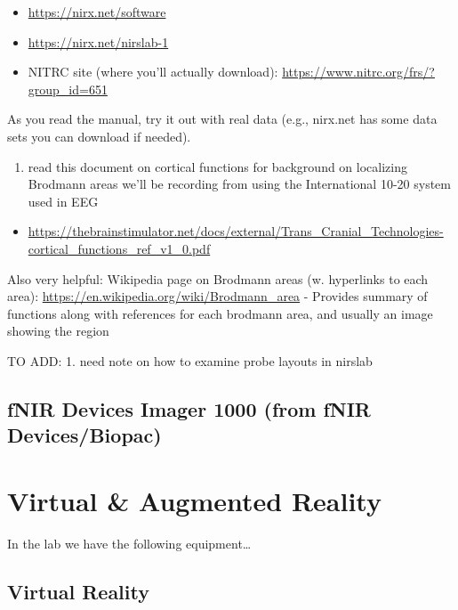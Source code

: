 \documentclass[
]{book}
\providecommand{\tightlist}{%
  \setlength{\itemsep}{0pt}\setlength{\parskip}{0pt}}
\begin{document}
\begin{itemize}
\tightlist
\item
  \url{https://nirx.net/software}
\item
  \url{https://nirx.net/nirslab-1}
\item
  NITRC site (where you'll actually download): \url{https://www.nitrc.org/frs/?group_id=651}
\end{itemize}

As you read the manual, try it out with real data (e.g., nirx.net has some data sets you can download if needed).

\begin{enumerate}
\def\labelenumi{\arabic{enumi}.}
\setcounter{enumi}{1}
\tightlist
\item
  read this document on cortical functions for background on localizing Brodmann areas we'll be recording from using the International 10-20 system used in EEG
\end{enumerate}

\begin{itemize}
\tightlist
\item
  \url{https://thebrainstimulator.net/docs/external/Trans_Cranial_Technologies-cortical_functions_ref_v1_0.pdf}
\end{itemize}

Also very helpful: Wikipedia page on Brodmann areas (w. hyperlinks to each area):
\url{https://en.wikipedia.org/wiki/Brodmann_area}
- Provides summary of functions along with references for each brodmann area, and usually an image showing the region

TO ADD:
1. need note on how to examine probe layouts in nirslab

\hypertarget{fnir-devices-imager-1000-from-fnir-devicesbiopac}{%
\section{fNIR Devices Imager 1000 (from fNIR Devices/Biopac)}\label{fnir-devices-imager-1000-from-fnir-devicesbiopac}}

\hypertarget{virtual-augmented-reality}{%
\chapter{Virtual \& Augmented Reality}\label{virtual-augmented-reality}}

In the lab we have the following equipment\ldots{}

\hypertarget{virtual-reality}{%
\section{Virtual Reality}\label{virtual-reality}}
\end{document}
